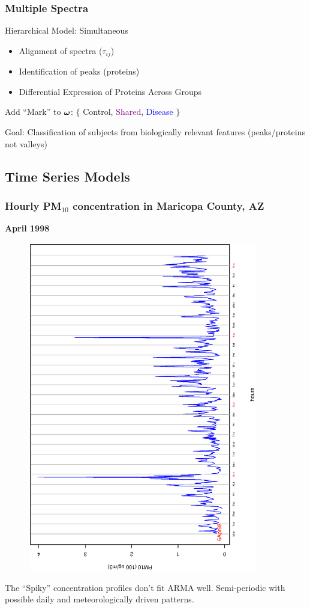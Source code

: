 \documentclass[dvips]{beamer}
\newcommand{\bs}[2]{\begin{frame} \frametitle{#1} 
{#2}
\end{frame} }
\newcommand{\blue}{\textcolor{Blue}}
\newcommand{\purple}{\textcolor{Purple}}
\newcommand{\red}{\textcolor{RedOrange}}
\begin{document}
\bs{Multiple Spectra}{ 
Hierarchical Model: Simultaneous
  \begin{itemize}
  \item  Alignment of spectra ($\tau_{ij}$)
   \item Identification of peaks (proteins)
   \item Differential Expression of Proteins Across Groups
  \end{itemize}
Add ``Mark'' to $\bm \omega$:   $\{$ \red{Control}, \purple{Shared},
\blue{Disease} $\}$

\vspace{.25in}
Goal: Classification of subjects from biologically relevant features
        (peaks/proteins not valleys)
}

\subsection{Time Series Models}
\bs{Hourly PM$_{10}$ concentration in Maricopa County, AZ} {
\centerline{\bf April 1998 }
\vspace{-8mm}
\begin{figure}[!h]
  \begin{center}
    \includegraphics[angle=270,origin=l, clip=1,
     totalheight=5truecm,width=10cm]{30daypm10.ps}
  \end{center}
\end{figure}
The ``Spiky'' concentration profiles don't fit ARMA well.
Semi-periodic with possible daily and meteorologically driven patterns.
}
\end{document}
